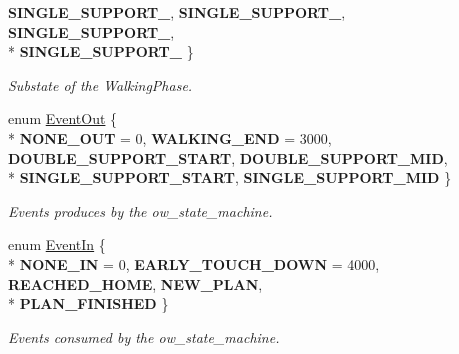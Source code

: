 \begin{DoxyCompactItemize}
{\bfseries S\+I\+N\+G\+L\+E\+\_\+\+S\+U\+P\+P\+O\+R\+T\+\_}, 
{\bfseries S\+I\+N\+G\+L\+E\+\_\+\+S\+U\+P\+P\+O\+R\+T\+\_}, 
{\bfseries S\+I\+N\+G\+L\+E\+\_\+\+S\+U\+P\+P\+O\+R\+T\+\_}, 
\\*
{\bfseries S\+I\+N\+G\+L\+E\+\_\+\+S\+U\+P\+P\+O\+R\+T\+\_}
 \}\hypertarget{classow__core_1_1Flags_a0d23fb94c71bd93061b7f966a9cd99fe}{}\label{classow__core_1_1Flags_a0d23fb94c71bd93061b7f966a9cd99fe}
\begin{DoxyCompactList}\small\item\em Substate of the Walking\+Phase. \end{DoxyCompactList}
\item 
enum \hyperlink{classow__core_1_1Flags_ae4eccd98004db199e779c28fad00ba89}{Event\+Out} \{ \\*
{\bfseries N\+O\+N\+E\+\_\+\+O\+UT} = 0, 
{\bfseries W\+A\+L\+K\+I\+N\+G\+\_\+\+E\+ND} = 3000, 
{\bfseries D\+O\+U\+B\+L\+E\+\_\+\+S\+U\+P\+P\+O\+R\+T\+\_\+\+S\+T\+A\+RT}, 
{\bfseries D\+O\+U\+B\+L\+E\+\_\+\+S\+U\+P\+P\+O\+R\+T\+\_\+\+M\+ID}, 
\\*
{\bfseries S\+I\+N\+G\+L\+E\+\_\+\+S\+U\+P\+P\+O\+R\+T\+\_\+\+S\+T\+A\+RT}, 
{\bfseries S\+I\+N\+G\+L\+E\+\_\+\+S\+U\+P\+P\+O\+R\+T\+\_\+\+M\+ID}
 \}\hypertarget{classow__core_1_1Flags_ae4eccd98004db199e779c28fad00ba89}{}\label{classow__core_1_1Flags_ae4eccd98004db199e779c28fad00ba89}
\begin{DoxyCompactList}\small\item\em Events produces by the ow\+\_\+state\+\_\+machine. \end{DoxyCompactList}
\item 
enum \hyperlink{classow__core_1_1Flags_a97da2cfc7e3e4b51aac33116f914bd2b}{Event\+In} \{ \\*
{\bfseries N\+O\+N\+E\+\_\+\+IN} = 0, 
{\bfseries E\+A\+R\+L\+Y\+\_\+\+T\+O\+U\+C\+H\+\_\+\+D\+O\+WN} = 4000, 
{\bfseries R\+E\+A\+C\+H\+E\+D\+\_\+\+H\+O\+ME}, 
{\bfseries N\+E\+W\+\_\+\+P\+L\+AN}, 
\\*
{\bfseries P\+L\+A\+N\+\_\+\+F\+I\+N\+I\+S\+H\+ED}
 \}\hypertarget{classow__core_1_1Flags_a97da2cfc7e3e4b51aac33116f914bd2b}{}\label{classow__core_1_1Flags_a97da2cfc7e3e4b51aac33116f914bd2b}
\begin{DoxyCompactList}\small\item\em Events consumed by the ow\+\_\+state\+\_\+machine. \end{DoxyCompactList}
\end{DoxyCompactItemize}
